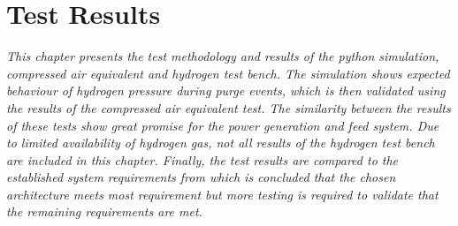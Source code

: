 \chapter{Test Results}%
\label{chap:testing}
\emph{
    This chapter presents the test methodology and results of the python simulation, compressed air equivalent and hydrogen test bench. The simulation shows expected behaviour of hydrogen pressure during purge events, which is then validated using the results of the compressed air equivalent test. The similarity between the results of these tests show great promise for the power generation and feed system.
    Due to limited availability of hydrogen gas, not all results of the hydrogen test bench are included in this chapter.
    Finally, the test results are compared to the established system requirements from which is concluded that the chosen architecture meets most requirement but more testing is required to validate that the remaining requirements are met.
}


\newpage


%
%
%


